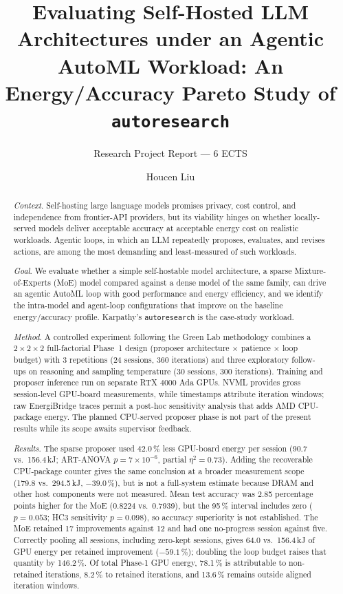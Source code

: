 \documentclass[sigconf,nonacm]{acmart}
\begin{document}
\title[Self-Hosted LLMs under an Agentic AutoML Workload]{
	Evaluating Self-Hosted LLM Architectures under an Agentic AutoML Workload: An Energy/Accuracy Pareto Study of \texttt{autoresearch}
}
\subtitle{Research Project Report --- 6 ECTS}

\author{Houcen Liu}
 

\begin{abstract}
\noindent \textit{Context}.
Self-hosting large language models promises privacy, cost control, and independence from frontier-API providers, but its viability hinges on whether locally-served models deliver acceptable accuracy at acceptable energy cost on realistic workloads. Agentic loops, in which an LLM repeatedly proposes, evaluates, and revises actions, are among the most demanding and least-measured of such workloads.

\noindent \textit{Goal}.
We evaluate whether a simple self-hostable model architecture, a sparse Mixture-of-Experts (MoE) model compared against a dense model of the same family, can drive an agentic AutoML loop with good performance and energy efficiency, and we identify the intra-model and agent-loop configurations that improve on the baseline energy/accuracy profile. Karpathy's \texttt{autoresearch} is the case-study workload.

\noindent \textit{Method}.
A controlled experiment following the Green Lab methodology combines a $2 \times 2 \times 2$ full-factorial Phase~1 design (proposer architecture $\times$ patience $\times$ loop budget) with 3 repetitions (24 sessions, 360 iterations) and three exploratory follow-ups on reasoning and sampling temperature (30 sessions, 300 iterations). Training and proposer inference run on separate RTX 4000 Ada GPUs. NVML provides gross session-level GPU-board measurements, while timestamps attribute iteration windows; raw EnergiBridge traces permit a post-hoc sensitivity analysis that adds AMD CPU-package energy. The planned CPU-served proposer phase is not part of the present results while its scope awaits supervisor feedback.

\noindent \textit{Results}.
The sparse proposer used 42.0\,\% less GPU-board energy per session
(90.7 vs.\ 156.4\,kJ; ART-ANOVA $p = 7\times10^{-6}$, partial $\eta^2 = 0.73$).
Adding the recoverable CPU-package counter gives the same conclusion at a broader
measurement scope (179.8 vs.\ 294.5\,kJ, $-39.0\,\%$), but is not a full-system
estimate because DRAM and other host components were not measured. Mean test
accuracy was 2.85 percentage points higher for the MoE (0.8224 vs.\ 0.7939), but
the 95\,\% interval includes zero ($p=0.053$; HC3 sensitivity $p=0.098$), so
accuracy superiority is not established. The MoE retained 17 improvements against
12 and had one no-progress session against five. Correctly pooling all sessions,
including zero-kept sessions, gives 64.0 vs.\ 156.4\,kJ of GPU energy per retained
improvement ($-59.1\,\%$); doubling the loop budget raises that quantity by
146.2\,\%. Of total Phase-1 GPU energy, 78.1\,\% is attributable to non-retained
iterations, 8.2\,\% to retained iterations, and 13.6\,\% remains outside aligned
iteration windows.


\end{abstract}
\end{document}
